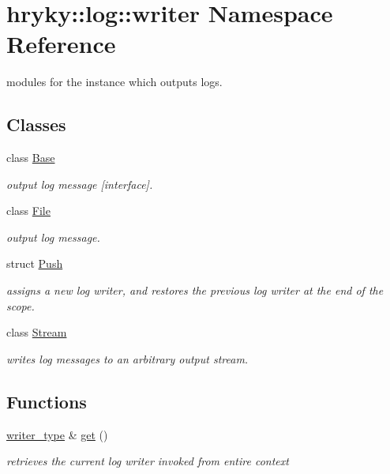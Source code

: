 \hypertarget{namespacehryky_1_1log_1_1writer}{\section{hryky\-:\-:log\-:\-:writer Namespace Reference}
\label{namespacehryky_1_1log_1_1writer}
}


modules for the instance which outputs logs.  


\subsection*{Classes}
\begin{DoxyCompactItemize}
\item 
class \hyperlink{classhryky_1_1log_1_1writer_1_1_base}{Base}
\begin{DoxyCompactList}\small\item\em output log message \mbox{[}interface\mbox{]}. \end{DoxyCompactList}\item 
class \hyperlink{classhryky_1_1log_1_1writer_1_1_file}{File}
\begin{DoxyCompactList}\small\item\em output log message. \end{DoxyCompactList}\item 
struct \hyperlink{structhryky_1_1log_1_1writer_1_1_push}{Push}
\begin{DoxyCompactList}\small\item\em assigns a new log writer, and restores the previous log writer at the end of the scope. \end{DoxyCompactList}\item 
class \hyperlink{classhryky_1_1log_1_1writer_1_1_stream}{Stream}
\begin{DoxyCompactList}\small\item\em writes log messages to an arbitrary output stream. \end{DoxyCompactList}\end{DoxyCompactItemize}
\subsection*{Functions}
\begin{DoxyCompactItemize}
\item 
\hyperlink{classhryky_1_1log_1_1writer_1_1_base}{writer\-\_\-type} \& \hyperlink{namespacehryky_1_1log_1_1writer_a67d38d407be7aaf3cc9ed3ac8e3b2835}{get} ()
\begin{DoxyCompactList}\small\item\em retrieves the current log writer invoked from entire context \end{DoxyCompactList}\end{DoxyCompactItemize}


